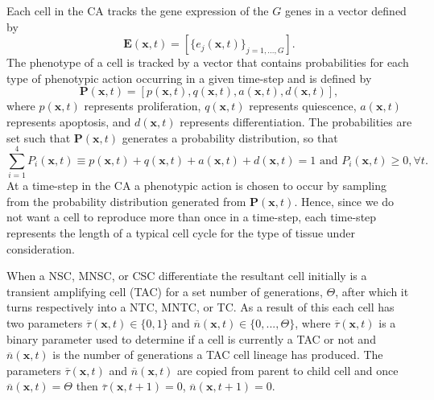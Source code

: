 \documentclass[\main/thesis.tex]{subfiles}
\begin{document}
Each cell in the CA tracks the gene expression of the $G$ genes in a vector defined by
\begin{equation}
    \boldsymbol{E}(\boldsymbol{x}, t) {=} [ \{ e_j(\boldsymbol{x}, t) \}_{j{=}1, ..., G} ].
    \label{eq:genExprsVector}
\end{equation}
The phenotype of a cell is tracked by a vector that contains probabilities for each type of phenotypic action occurring in a given time-step and is defined by
\begin{equation}
\boldsymbol{P}(\boldsymbol{x}, t) {=} [ p(\boldsymbol{x}, t), q(\boldsymbol{x}, t), a(\boldsymbol{x}, t), d(\boldsymbol{x}, t) ],
\label{eq:phenotypeVector}
\end{equation}
where $p(\boldsymbol{x}, t)$ represents proliferation, $q(\boldsymbol{x}, t)$ represents quiescence, $a(\boldsymbol{x}, t)$ represents apoptosis, and $d(\boldsymbol{x}, t)$ represents differentiation. The probabilities are set such that $\boldsymbol{P}(\boldsymbol{x}, t)$ generates a probability distribution, so that 
\begin{equation}
\sum_{i{=}1}^4 P_i(\boldsymbol{x}, t) {\equiv} p(\boldsymbol{x}, t) {+} q(\boldsymbol{x}, t) {+} a(\boldsymbol{x}, t) {+} d(\boldsymbol{x}, t) {=} 1 \text{ and } P_i(\boldsymbol{x}, t) {\ge} 0, {\forall} t.
\label{eq:phenotypeSumCondition}
\end{equation}
At a time-step in the CA a phenotypic action is chosen to occur by sampling from the probability distribution generated from $\boldsymbol{P}(\boldsymbol{x}, t)$. Hence, since we do not want a cell to reproduce more than once in a time-step, each time-step represents the length of a typical cell cycle for the type of tissue under consideration.

When a NSC, MNSC, or CSC differentiate the resultant cell 
initially is a transient amplifying cell (TAC) for a set number of generations, 
$\Theta$, after which it turns respectively into a NTC, MNTC, or TC. As a result 
of this each cell has two parameters $\overline{\tau}(\boldsymbol{x}, t) {\in} \{0, 1\}$ and
$\overline{n}(\boldsymbol{x}, t) {\in} \{0, ..., \Theta\}$, where 
$\overline{\tau}(\boldsymbol{x}, t)$ is a binary parameter used to determine if a cell is currently 
a TAC or not and $\overline{n}(\boldsymbol{x}, t)$ is the number of generations a TAC cell lineage has produced. The parameters $\overline{\tau}(\boldsymbol{x}, t)$ and $\overline{n}(\boldsymbol{x}, t)$ are copied from parent to child cell and once $\overline{n}(\boldsymbol{x}, t) {=} \Theta$ then 
$\overline{\tau}(\boldsymbol{x}, t{+}1) {=} 0$, $\overline{n}(\boldsymbol{x}, t{+}1) {=} 0$. 
\end{document}

